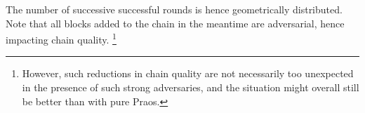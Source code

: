 \begin{enumerate}
  The number of successive successful rounds is hence geometrically distributed.
  Note that all blocks added to the chain in the meantime are adversarial, hence impacting chain quality.
  \footnote{However, such reductions in chain quality are not necessarily too unexpected in the presence of such strong adversaries, and the situation might overall still be better than with pure Praos.}
\end{enumerate}



